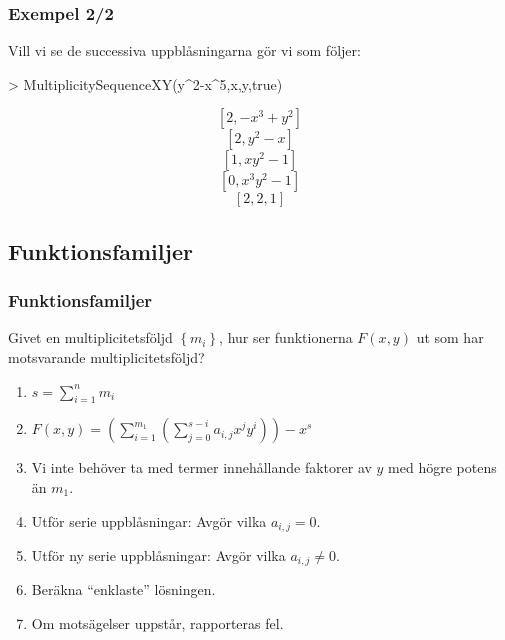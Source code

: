 \documentclass{beamer}
\begin{document}
\begin{frame}
	\frametitle{Exempel 2/2}
	\begin{example}
		Vill vi se de successiva uppblåsningarna gör vi som följer:
		
		\begin{semiverbatim}
			> MultiplicitySequenceXY(y\^{}2-x\^{}5,x,y,true)
		\end{semiverbatim}
		\[[2,-x^3+y^2]\]
		\[[2,y^2-x]\]
		\[[1,xy^2-1]\]
		\[[0,x^3y^2-1]\]
		\[\left[2, 2, 1\right]\]
	\end{example}
\end{frame}



\subsection{Funktionsfamiljer}

\begin{frame}
	\frametitle{Funktionsfamiljer}
	Givet en multiplicitetsföljd $\left\{m_i\right\}$, hur ser funktionerna $F(x,y)$ ut som har motsvarande multiplicitetsföljd?
	
	
	\begin{enumerate}
		\item<3-> $s=\sum_{i=1}^{n} m_i$
		\item<4-> $F(x,y)=\left(\sum_{i=1}^{m_1}\left(\sum_{j=0}^{s-i} a_{i,j} x^j y^i\right)\right)-x^s$
		\item<5-> Vi inte behöver ta med termer innehållande faktorer av $y$ med högre potens än $m_1$.
		\item<6-> Utför serie uppblåsningar: Avgör vilka $a_{i,j}=0$.
		\item<7-> Utför ny serie uppblåsningar: Avgör vilka $a_{i,j} \neq 0$.
		\item<8-> Beräkna ``enklaste'' lösningen.
		\item<9-> Om motsägelser uppstår, rapporteras fel.
	\end{enumerate}
\end{frame}
\end{document}
